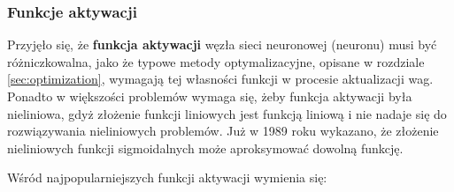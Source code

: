  \subsubsection{Funkcje aktywacji}
  \par Przyjęło się, że \textbf{funkcja aktywacji} węzła sieci neuronowej (neuronu) musi być różniczkowalna, jako że typowe metody optymalizacyjne, opisane w rozdziale \ref{sec:optimization}, wymagają tej własności funkcji w procesie aktualizacji wag. Ponadto w większości problemów wymaga się, żeby funkcja aktywacji była nieliniowa, gdyż złożenie funkcji liniowych jest funkcją liniową i nie nadaje się do rozwiązywania nieliniowych problemów. Już w 1989 roku wykazano, że złożenie nieliniowych funkcji sigmoidalnych może aproksymować dowolną funkcję\cite{cybenko1989approximation}.
  \par
 Wśród najpopularniejszych funkcji aktywacji wymienia się:
 \par
{}


